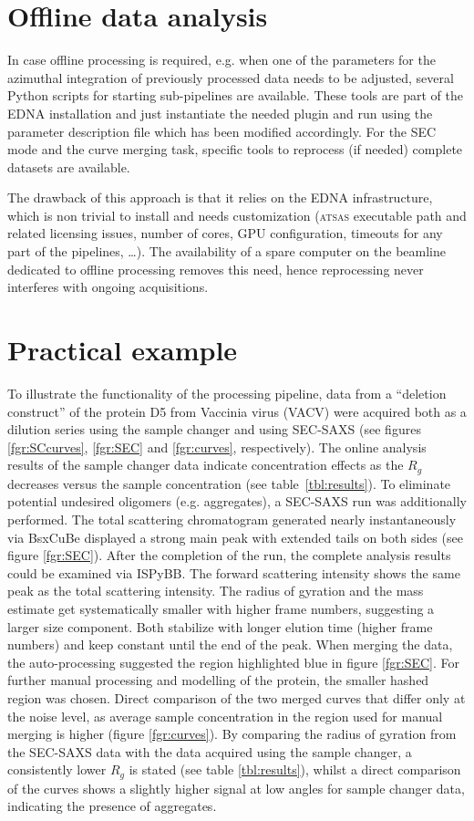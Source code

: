\documentclass[preprint,pdf]{iucr}              %
\begin{document}
\section{Offline data analysis}
In case offline processing is required, e.g. when one of the parameters for
the azimuthal integration of previously processed data needs to be adjusted,
several Python scripts for starting sub-pipelines are available.
These tools are part of the EDNA installation and just instantiate the needed
plugin and run using the parameter description file which has been modified
accordingly.
For the SEC mode and the curve merging task, specific tools to reprocess (if
needed) complete datasets are available.

The drawback of this approach is that it relies on the EDNA infrastructure, which is
non trivial to install and needs customization 
(\textsc{atsas} executable path and related licensing issues, number of cores,
GPU configuration, timeouts for any part of the pipelines, \ldots).
The availability of a spare computer on the beamline dedicated to offline
processing removes this need, hence reprocessing never interferes with ongoing
acquisitions.

\section{Practical example}
To illustrate the functionality of the processing pipeline, data from
a ``deletion construct'' of the protein D5 from  Vaccinia virus (VACV)
were acquired both as a dilution series using the sample changer and
using SEC-SAXS (see figures \ref{fgr:SCcurves}, \ref{fgr:SEC} and
\ref{fgr:curves}, respectively).
The online analysis results of the sample changer data indicate concentration effects
as the $R_g$ decreases versus the  sample concentration (see
table~\ref{tbl:results}).
To eliminate potential undesired oligomers (e.g. aggregates), a SEC-SAXS run
was additionally performed.
The total scattering chromatogram generated nearly instantaneously via
BsxCuBe displayed a strong main peak with extended tails on both sides (see
figure \ref{fgr:SEC}).
After the completion of the run, the complete analysis results could be
examined via ISPyBB.
The forward scattering intensity shows the same peak as the total scattering intensity.
The radius of gyration and the mass estimate get systematically
smaller with higher frame numbers, suggesting a larger size component.
Both stabilize with longer elution time (higher frame numbers) and keep 
constant until the end of the peak.
When merging the data, the auto-processing suggested the region highlighted
blue in figure \ref{fgr:SEC}.
For further manual processing and modelling of the protein, the smaller
hashed region was chosen.
Direct comparison of the two merged curves that differ only at the noise
level, as average sample concentration in the region used for manual 
merging is higher (figure \ref{fgr:curves}).
By comparing the radius of gyration from the SEC-SAXS data with the data
acquired using the sample changer, a consistently lower $R_g$ is stated (see
table \ref{tbl:results}), whilst a direct comparison of the curves shows a
slightly higher signal at low angles for sample changer data, indicating
the presence of aggregates.
\end{document}
